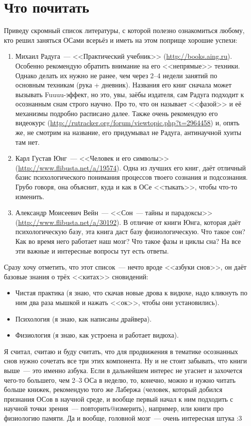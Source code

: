\documentclass[a4paper,14pt,oneside]{memoir}
\begin{document}
\section{Что почитать}

Приведу скромный список литературы, с которой полезно ознакомиться любому, кто решил заняться ОСами всерьёз и иметь на этом поприще хорошие успехи:
\begin{enumerate}
\item Михаил Радуга~--- <<Практический учебник>> (\url{http://books.aing.ru}). Особенно рекомендую обратить внимание на его <<непрямые>> техники. Однако делать их нужно не ранее, чем через 2--4 недели занятий по основным техникам (рука + дневник). Названия его книг сначала может вызывать Fuuuu-эффект, но это, увы, заёбы издателя, сам Радуга подходит к осознанным снам строго научно. Про то, что он называет <<фазой>> и её механизмы подробно расписано далее. Также очень рекомендую его видеокурс (\url{http://rutracker.org/forum/viewtopic.php?t=2964458}) и, опять же, не смотрим на название, его придумывал не Радуга, антинаучной хуиты там нет.
\item Карл Густав Юнг~--- <<Человек и его символы>> (\url{http://www.flibusta.net/a/19574}). Одна из лучших его книг, даёт отличный базис психологического понимания процессов твоего сознания и подсознания. Грубо говоря, она объяснит, куда и как в ОСе <<тыкать>>, чтобы что-то изменить. 
\item Александр Моисеевич Вейн~--- <<Сон~--- тайны и парадоксы>> (\url{http://www.flibusta.net/a/30192}). В отличие от книги Юнга, которая даёт психологическую базу, эта книга даст базу физиологическую. Что такое сон? Как во время него работает наш мозг? Что такое фазы и циклы сна? На все эти важные и интересные вопросы тут есть ответы.
\end{enumerate} 

Сразу хочу отметить, что этот список~--- нечто вроде <<азбуки снов>>, он даёт базовые знания о трёх <<китах>> сновидений:
\begin{itemize}
\item Чистая практика (я знаю, что скачав новые дрова к видюхе, надо кликнуть по ним два раза мышкой и нажать <<ок>>, чтобы они установились).
\item Психология (я знаю, как написаны драйвера).
\item Физиология (я знаю, как устроена и работает видюха).
\end{itemize}

\makeatletter
Я считал, считаю и буду считать, что для продвижения в тематике осознанных снов нужно сочетать все три этих компонента. 
Ну и не стоит забывать, что книги выше~--- это именно азбука. Если в дальнейшем интерес не угаснет и захочется чего-то большего, чем 2--3 ОСа в неделю, то, конечно, можно и нужно читать больше книжек, рекомендую того же Лабержа (человек, который добился признания ОСов в научной среде, и вообще первый начал к ним подходить с научной точки зрения~--- повторить@измерить), например, или книги про физиологию памяти. Да и вообще, головной мозг~--- очень интересная штука :3
\makeatother
\end{document}

